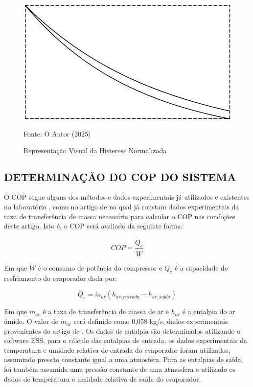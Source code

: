 \begin{figure}[h]
    \centering
    \includegraphics[width=0.75\linewidth]{FigurasdoTexto/Representação visual da histerese.png}
    \caption{Representação Visual da Histerese Normalizada}
    \label{fig:representação visual da histerese normalizada}
    {\footnotesize Fonte: O Autor (2025)}
\end{figure}


\subsection{\MakeUppercase{Determinação do COP do Sistema}} \label{subsec:Determinação do COP do Sistema}

O COP segue alguns dos métodos e dados experimentais já utilizados e existentes no laboratório \textcite{reve2023}, como no artigo de \textcite{ExperimentalThermalPerformance} no qual já constam dados experimentais da taxa de transferência de massa necessária para calcular o COP nas condições deste artigo. Isto é, o COP será avaliado da seguinte forma:

\begin{equation}
    COP = \frac{\dot Q_e}{\dot W}
    \label{eq:COP}
\end{equation}

Em que $\dot W$ é o consumo de potência do compressor e $ \dot Q_e$ é a capacidade de resfriamento do evaporador dada por:

\begin{equation}
    \dot Q_e = \dot m_{ar}(h_{ar,entrada} - h_{ar,saída})
\end{equation}

Em que $\dot m_{ar}$ é a taxa de transferência de massa de ar e $h_{ar}$ é a entalpia do ar úmido. O valor de $\dot m_{ar}$ será definido como 0,058 kg/s, dados experimentais provenientes do artigo de \textcite{ExperimentalThermalPerformance}. Os dados de entalpia são determinados utilizando o software ESS, para o cálculo das entalpias de entrada, os dados experimentais da temperatura e umidade relativa de entrada do evaporador foram utilizados, assumindo pressão constante igual a uma atmosfera. Para as entalpias de saída, foi também assumida uma pressão constante de uma atmosfera e utilizado os dados de temperatura e umidade relativa de saída do evaporador. 